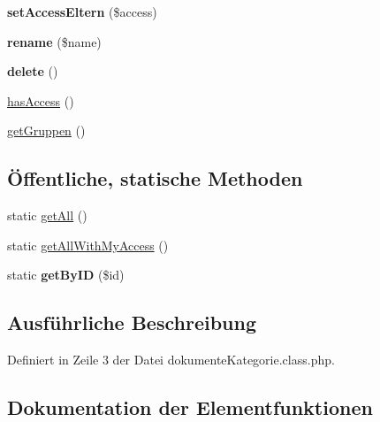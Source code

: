 \begin{DoxyCompactItemize}
{\bfseries set\+Access\+Eltern} (\$access)
\item 
\mbox{\label{classdokumente_kategorie_a6493b972429144e288597050a8377660}} 
{\bfseries rename} (\$name)
\item 
\mbox{\label{classdokumente_kategorie_a775a67216d1a44477bcccf847b7d20c2}} 
{\bfseries delete} ()
\item 
\mbox{\hyperlink{classdokumente_kategorie_ae5f27a53ca5a1b4ee548225d4219163e}{has\+Access}} ()
\item 
\mbox{\hyperlink{classdokumente_kategorie_a6c4053ace49b6043111554ac8a71c082}{get\+Gruppen}} ()
\end{DoxyCompactItemize}
\subsection*{Öffentliche, statische Methoden}
\begin{DoxyCompactItemize}
\item 
static \mbox{\hyperlink{classdokumente_kategorie_aee2d42613c0d261440b83d30885320e2}{get\+All}} ()
\item 
static \mbox{\hyperlink{classdokumente_kategorie_a64bcff52f84fa4610982775a9e755117}{get\+All\+With\+My\+Access}} ()
\item 
\mbox{\label{classdokumente_kategorie_a07407c31a2750f04d22b339168b71ae4}} 
static {\bfseries get\+By\+ID} (\$id)
\end{DoxyCompactItemize}


\subsection{Ausführliche Beschreibung}


Definiert in Zeile 3 der Datei dokumente\+Kategorie.\+class.\+php.



\subsection{Dokumentation der Elementfunktionen}
\mbox{\label{classdokumente_kategorie_aee2d42613c0d261440b83d30885320e2}} 
